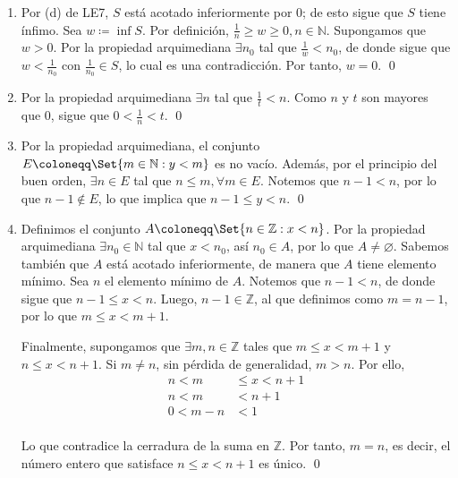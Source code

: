 \documentclass[11pt]{article}
\newcommand{\N}{\mathbb{N}}
\newcommand{\Z}{\mathbb{Z}}
\newcommand{\defined}{\coloneqq}
\let\for\forall
\let\emptyset\varnothing
\let\set\Set
\begin{document}
\begin{enumerate}[label=\alph*)]
    \item Por (d) de LE7, $S$ está acotado inferiormente por $0$; de esto sigue que $S$ tiene ínfimo. Sea $w\coloneqq \inf{S}$. Por definición, $\frac{1}{n}\geq w\geq 0, n\in \N$. Supongamos que $w>0$. Por la propiedad arquimediana $\exists n_0$ tal que $\frac{1}{w} < n_0$, de donde sigue que $w<\frac{1}{n_0}$ con $\frac{1}{n_0} \in S$, lo cual es una contradicción. Por tanto, $w=0$. \qed
    
    \item Por la propiedad arquimediana $\exists n$ tal que $\frac{1}{t}<n$. Como $n$ y $t$ son mayores que $0$, sigue que $0<\frac{1}{n}<t$. \qed
    
    \item Por la propiedad arquimediana, el conjunto $E\coloneqq \set{m\in \N: y<m}$ es no vacío. Además, por el principio del buen orden, $\exists n\in E$ tal que $n\leq m, \for m\in E$. Notemos que $n-1<n$, por lo que $n-1\notin E$, lo que implica que $n-1\leq y<n$. \qed
    
    \item Definimos el conjunto $A\defined \set{n\in \Z: x<n}$. Por la propiedad arquimediana $\exists n_0 \in \N$ tal que $x<n_0$, así $n_0\in A$, por lo que $A\neq \emptyset$. Sabemos también que $A$ está acotado inferiormente, de manera que $A$ tiene elemento mínimo. Sea $n$ el elemento mínimo de $A$. Notemos que $n-1<n$, de donde sigue que $n-1\leq x<n$. Luego, $n-1\in \Z$, al que definimos como $m=n-1$, por lo que $m\leq x<m+1$.
    
    Finalmente, supongamos que $\exists m, n\in \Z$ tales que $m\leq x<m+1$ y $n\leq x<n+1$. Si $m\neq n$, sin pérdida de generalidad, $m>n$. Por ello, \begin{align*}
        n < m &\leq x<n+1 \\
        n < m &<n+1 \\
        0 < m-n &<1
    \end{align*}\\    
    Lo que contradice la cerradura de la suma en $\Z$. Por tanto, $m=n$, es decir, el número entero que satisface $n\leq x<n+1$ es único. \qed
    
%
\end{enumerate}
\end{document}
